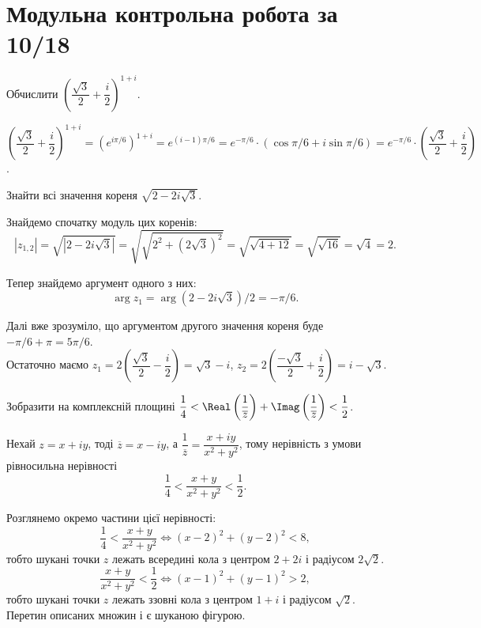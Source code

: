 \setcounter{section}{7}

\section{Модульна контрольна робота за 10/18}


\begin{problem}
    Обчислити $\left(\dfrac{\sqrt{3}}{2} + \dfrac i2 \right)^{1+i}$.
\end{problem}

\begin{solution}
    $\left(\dfrac{\sqrt{3}}{2} + \dfrac i2 \right)^{1+i}=\left(e^{i\pi/6}\right)^{1+i} = e^{(i - 1) \pi / 6} = e^{-\pi / 6} \cdot (\cos \pi / 6 + i \sin \pi / 6 ) = e^{-\pi / 6} \cdot \left(\dfrac{\sqrt{3}}{2}+\dfrac{i}{2}\right)$.
\end{solution}

\begin{problem}
    Знайти всі значення кореня $\sqrt{2 - 2i\sqrt{3}}$.
\end{problem}

\begin{solution}
    Знайдемо спочатку модуль цих коренів:
    \[ |z_{1,2}| = \sqrt{|2 - 2i\sqrt{3}|} = \sqrt{\sqrt{2^2 +\left(2\sqrt{3}\right)^2}} = \sqrt{\sqrt{4 + 12}} = \sqrt{\sqrt{16}} = \sqrt{4} = 2. \]
    
    Тепер знайдемо аргумент одного з них:
    \[ \arg z_1 = \arg \left(2 - 2i\sqrt{3}\right) / 2 = - \pi / 6.\]
    
    Далі вже зрозуміло, що аргументом другого значення кореня буде $- \pi / 6 + \pi = 5 \pi / 6$. \\
    
    Остаточно маємо $z_1 = 2 \left(\dfrac{\sqrt{3}}{2} - \dfrac{i}{2}\right) = \sqrt{3} - i$, $z_2 = 2 \left(\dfrac{-\sqrt{3}}{2} + \dfrac{i}{2}\right) = i - \sqrt{3}$.
\end{solution}

\begin{problem}
    Зобразити на комплексній площині $\dfrac14<\Real\left(\dfrac1{\overline{z}}\right) + \Imag\left(\dfrac1{\overline{z}}\right)<\dfrac12$.
\end{problem}

\begin{solution}
    Нехай $z = x + iy$, тоді $\overline{z} = x - iy$, а $\dfrac{1}{\overline{z}} = \dfrac{x + iy}{x^2 + y^2}$, тому нерівність з умови рівносильна нерівності
    \[ \dfrac14 < \dfrac{x + y}{x^2 + y^2} < \dfrac12.\]
    
    Розглянемо окремо частини цієї нерівності:
    \[ \dfrac14 < \dfrac{x+y}{x^2+y^2} \Leftrightarrow (x - 2)^2 + (y - 2)^2 < 8,\]
    тобто шукані точки $z$ лежать всередині кола з центром $2+2i$ і радіусом $2\sqrt{2}$. \\
    
    \[ \dfrac{x+y}{x^2+y^2} < \dfrac12 \Leftrightarrow (x - 1)^2 + (y - 1)^2 > 2,\]
    тобто шукані точки $z$ лежать ззовні кола з центром $1+i$ і радіусом $\sqrt{2}$. \\
    
    Перетин описаних множин і є шуканою фігурою.
\end{solution}

